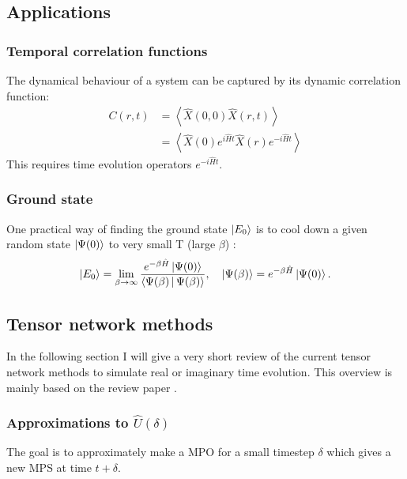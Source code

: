 \subsection{Applications}

\subsubsection{Temporal correlation functions}
The dynamical behaviour of a system can be captured by its dynamic correlation function:
\begin{equation}
    \begin{split}
        C(r,t) &= \left<  \hat{X}(0,0) \hat{X}(r,t)  \right >\\
        &=  \left<  \hat{X}(0)  e^{i \hat{H} t}  \hat{X}(r)  e^{-i \hat{H} t}   \right >
    \end{split}
\end{equation}
This requires time evolution operators $e^{-i \hat{H} t}$.

\subsubsection{Ground state}
One practical way of finding the ground state $ \ket{E_0}$ is to cool down a given random state $ \ket{\Psi(0)}$ to very small T (large $\beta$) \cite{Orus2014}:
\begin{equation}
    \ket{E_0} = \lim_{\beta \rightarrow \infty} \frac{e^{-\beta \hat{H} } \ket{\Psi(0)}  }{  \Braket{ \Psi(\beta) | \Psi(\beta) }  } ,\quad  \ket{\Psi(\beta)} =  e^{-\beta \hat{H} } \ket{\Psi(0)} .
\end{equation}

\subsection{Tensor network methods}\label{rt_tn_methods}
In the following section I will give a very short review of the current tensor network methods to simulate real or imaginary time evolution. This overview is mainly based on the review paper \cite{Paeckel2019}.


\subsubsection{Approximations to \texorpdfstring{$ \hat{U}(\delta)$}{U}}
The goal is to approximately make a MPO for a small timestep $\delta$ which gives a new MPS at time $t+\delta$.
